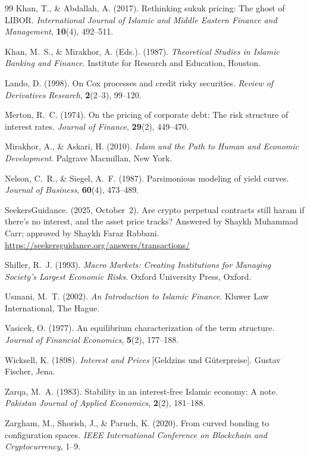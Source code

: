 \documentclass[10pt,twocolumn]{article}
\theoremstyle{plain}
\theoremstyle{definition}
\begin{document}
\begin{thebibliography}{99}
Khan, T., \& Abdallah, A. (2017).
Rethinking sukuk pricing: The ghost of LIBOR.
\textit{International Journal of Islamic and Middle Eastern
Finance and Management}, \textbf{10}(4), 492--511.

Khan, M.~S., \& Mirakhor, A. (Eds.). (1987).
\textit{Theoretical Studies in Islamic Banking and Finance}.
Institute for Research and Education, Houston.

Lando, D. (1998).
On Cox processes and credit risky securities.
\textit{Review of Derivatives Research}, \textbf{2}(2--3), 99--120.

Merton, R.~C. (1974).
On the pricing of corporate debt: The risk structure of
interest rates.
\textit{Journal of Finance}, \textbf{29}(2), 449--470.

Mirakhor, A., \& Askari, H. (2010).
\textit{Islam and the Path to Human and Economic Development}.
Palgrave Macmillan, New York.

Nelson, C.~R., \& Siegel, A.~F. (1987).
Parsimonious modeling of yield curves.
\textit{Journal of Business}, \textbf{60}(4), 473--489.

SeekersGuidance. (2025, October~2).
Are crypto perpetual contracts still haram if there's no interest,
and the asset price tracks? Answered by Shaykh Muhammad Carr;
approved by Shaykh Faraz Rabbani.
\url{https://seekersguidance.org/answers/transactions/}

Shiller, R.~J. (1993).
\textit{Macro Markets: Creating Institutions for Managing
Society's Largest Economic Risks}.
Oxford University Press, Oxford.

Usmani, M.~T. (2002).
\textit{An Introduction to Islamic Finance}.
Kluwer Law International, The Hague.

Vasicek, O. (1977).
An equilibrium characterization of the term structure.
\textit{Journal of Financial Economics}, \textbf{5}(2), 177--188.

Wicksell, K. (1898).
\textit{Interest and Prices} [Geldzins und Güterpreise].
Gustav Fischer, Jena.

Zarqa, M.~A. (1983).
Stability in an interest-free Islamic economy: A note.
\textit{Pakistan Journal of Applied Economics}, \textbf{2}(2),
181--188.

Zargham, M., Shorish, J., \& Paruch, K. (2020).
From curved bonding to configuration spaces.
\textit{IEEE International Conference on Blockchain and
Cryptocurrency}, 1--9.

\end{thebibliography}
\end{document}
